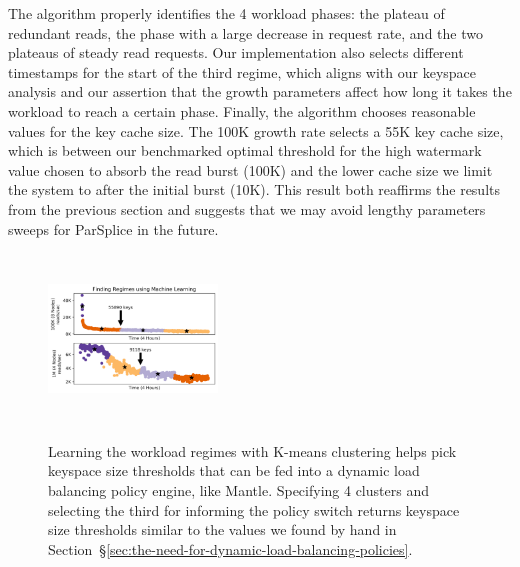 The algorithm properly identifies the 4 workload phases: the plateau of
redundant reads, the phase with a large decrease in request rate, and the two
plateaus of steady read requests. Our implementation also selects different
timestamps for the start of the third regime, which aligns with our keyspace
analysis and our assertion that the growth parameters affect how long it takes
the workload to reach a certain phase.  Finally, the algorithm chooses
reasonable values for the key cache size. The 100K growth rate selects a 55K
key cache size, which is between our benchmarked optimal threshold for the high
watermark value chosen to absorb the read burst (100K) and the lower cache size
we limit the system to after the initial burst (10K). This result both
reaffirms the results from the previous section and suggests that we may avoid
lengthy parameters sweeps for ParSplice in the future.

\begin{figure}[t]
\noindent\includegraphics[height=4.5cm,width=0.4\textwidth]{figures/futurework-regimes.png}\\
  \caption{Learning the workload regimes with K-means clustering helps pick
  keyspace size thresholds that can be fed into a dynamic load balancing policy
  engine, like Mantle. Specifying 4 clusters and selecting the third for
  informing the policy switch returns keyspace size thresholds similar to the
  values we found by hand in
  Section~\S\ref{sec:the-need-for-dynamic-load-balancing-policies}.
\label{fig:futurework-regimes}}
\end{figure}
